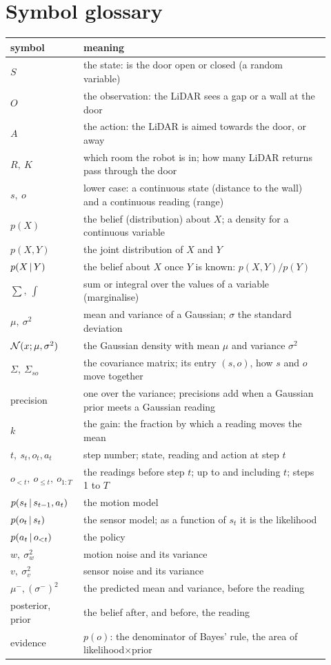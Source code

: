 \documentclass[11pt]{article}
\begin{document}
\section{Symbol glossary}
\begin{center}
\small
\begin{tabular}{p{0.17\linewidth}p{0.75\linewidth}}
\toprule symbol & meaning\\\midrule
$S$ & the state: is the door open or closed (a random variable)\\
$O$ & the observation: the LiDAR sees a gap or a wall at the door\\
$A$ & the action: the LiDAR is aimed towards the door, or away\\
$R,\ K$ & which room the robot is in; how many LiDAR returns pass through the door\\
$s,\ o$ & lower case: a continuous state (distance to the wall) and a continuous reading (range)\\
$p(X)$ & the belief (distribution) about $X$; a density for a continuous variable\\
$p(X,Y)$ & the joint distribution of $X$ and $Y$\\
$p(X\,|\, Y)$ & the belief about $X$ once $Y$ is known: $p(X,Y)/p(Y)$\\
$\sum,\ \int$ & sum or integral over the values of a variable (marginalise)\\
$\mu,\ \sigma^2$ & mean and variance of a Gaussian; $\sigma$ the standard deviation\\
$\mathcal{N}(x;\mu,\sigma^2)$ & the Gaussian density with mean $\mu$ and variance $\sigma^2$\\
$\Sigma,\ \Sigma_{so}$ & the covariance matrix; its entry $(s,o)$, how $s$ and $o$ move together\\
precision & one over the variance; precisions add when a Gaussian prior meets a Gaussian reading\\
$k$ & the gain: the fraction by which a reading moves the mean\\
$t,\ s_t,o_t,a_t$ & step number; state, reading and action at step $t$\\
$o_{<t},\ o_{\le t},\ o_{1:T}$ & the readings before step $t$; up to and including $t$; steps 1 to $T$\\
$p(s_t\,|\, s_{t-1},a_t)$ & the motion model\\
$p(o_t\,|\, s_t)$ & the sensor model; as a function of $s_t$ it is the likelihood\\
$p(a_t\,|\, o_{<t})$ & the policy\\
$w,\ \sigma_w^2$ & motion noise and its variance\\
$v,\ \sigma_v^2$ & sensor noise and its variance\\
$\mu^-,(\sigma^-)^2$ & the predicted mean and variance, before the reading\\
posterior, prior & the belief after, and before, the reading\\
evidence & $p(o)$: the denominator of Bayes' rule, the area of likelihood$\times$prior\\
\bottomrule
\end{tabular}
\end{center}
\end{document}
